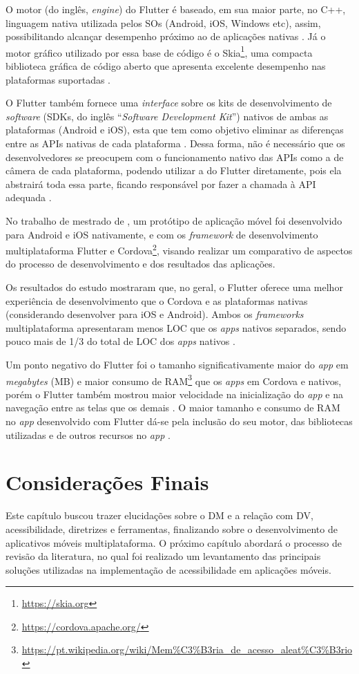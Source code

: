 O motor (do inglês, \emph{engine}) do Flutter é baseado, em sua maior parte, no C++, linguagem nativa utilizada pelos SOs (Android, iOS, Windows etc), assim,
possibilitando alcançar desempenho próximo ao de aplicações nativas \cite{zammetti2019practical,kuzmin2020experience}. Já o motor gráfico utilizado por essa
base de código é o Skia\footnote{\url{https://skia.org}}, uma compacta biblioteca gráfica de código aberto que apresenta excelente desempenho nas plataformas
suportadas \cite{zammetti2019practical,boukhary2019clean}.

O Flutter também fornece uma \emph{interface} sobre os kits de desenvolvimento de \emph{software} (SDKs, do inglês ``\emph{Software Development Kit}'')
nativos de ambas as plataformas (Android e iOS), esta que tem como objetivo eliminar as diferenças entre as APIs nativas de cada plataforma \cite{zammetti2019practical}.
Dessa forma, não é necessário que os desenvolvedores se preocupem com o funcionamento nativo das APIs como a de câmera de cada plataforma, podendo utilizar
a do Flutter diretamente, pois ela abstrairá toda essa parte, ficando responsável por fazer a chamada à API adequada \cite{zammetti2019practical}.

No trabalho de mestrado de , um protótipo de aplicação móvel foi desenvolvido para Android e iOS nativamente, e com os
\emph{framework} de desenvolvimento multiplataforma Flutter e Cordova\footnote{\url{https://cordova.apache.org/}}, visando realizar um comparativo de
aspectos do processo de desenvolvimento e dos resultados das aplicações. 

Os resultados do estudo mostraram que, no geral, o Flutter oferece uma melhor experiência de desenvolvimento que o Cordova e as plataformas nativas
(considerando desenvolver para iOS e Android). Ambos os \emph{frameworks} multiplataforma apresentaram menos LOC que os \emph{apps} nativos separados,
sendo pouco mais de 1/3 do total de LOC dos \emph{apps} nativos \cite{gonsalves2019evaluating}.

Um ponto negativo do Flutter foi o tamanho significativamente maior do \emph{app} em \emph{megabytes} (MB) e maior consumo de RAM\footnote{\url{https://pt.wikipedia.org/wiki/Mem\%C3\%B3ria_de_acesso_aleat\%C3\%B3rio}}
que os \emph{apps} em Cordova e nativos, porém o Flutter também mostrou maior velocidade na inicialização do \emph{app} e na navegação entre as telas
que os demais \cite{gonsalves2019evaluating}. O maior tamanho e consumo de RAM no \emph{app} desenvolvido com Flutter dá-se pela inclusão do seu motor,
das bibliotecas utilizadas e de outros recursos no \emph{app} \cite{gonsalves2019evaluating,zammetti2019practical}.

\section{Considerações Finais}

Este capítulo buscou trazer elucidações sobre o DM e a relação com DV, acessibilidade, diretrizes e ferramentas,
finalizando sobre o desenvolvimento de aplicativos móveis multiplataforma.
O próximo capítulo abordará o processo de revisão da literatura, no qual foi realizado um levantamento das principais soluções
utilizadas na implementação de acessibilidade em aplicações móveis.